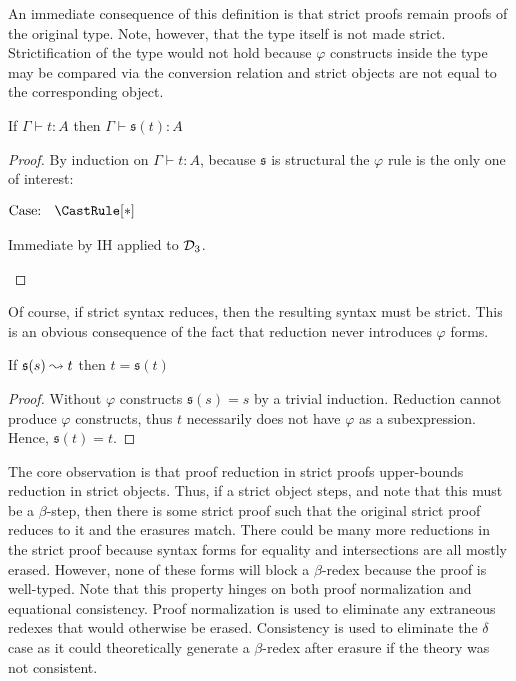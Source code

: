 An immediate consequence of this definition is that strict proofs remain proofs of the original type.
Note, however, that the type itself is not made strict.
Strictification of the type would not hold because $\varphi$ constructs inside the type may be compared via the conversion relation and strict objects are not equal to the corresponding object.
\begin{lemma}
    \label{lem:5:strict_proof}
    If $\Gamma \vdash t : A$ then $\Gamma \vdash \mathfrak{s}(t) : A$
\end{lemma}
\begin{proof}
    By induction on $\Gamma \vdash t : A$, because $\mathfrak{s}$ is structural the $\varphi$ rule is the only one of interest:

    $\text{Case: }\begin{array}{c} \CastRule[*] \end{array}$
    \begin{proofcase}
        Immediate by IH applied to $\mathcal{D}_{3}$.
    \end{proofcase}
\end{proof}
Of course, if strict syntax reduces, then the resulting syntax must be strict.
This is an obvious consequence of the fact that reduction never introduces $\varphi$ forms.
\begin{lemma}
    \label{lem:5:strict_preservation}
    If $\mathfrak{s}(s) \leadsto t$ then $t = \mathfrak{s}(t)$
\end{lemma}
\begin{proof}
    Without $\varphi$ constructs $\mathfrak{s}(s) = s$ by a trivial induction.
    Reduction cannot produce $\varphi$ constructs, thus $t$ necessarily does not have $\varphi$ as a subexpression.
    Hence, $\mathfrak{s}(t) = t$.
\end{proof}
The core observation is that proof reduction in strict proofs upper-bounds reduction in strict objects.
Thus, if a strict object steps, and note that this must be a $\beta$-step, then there is some strict proof such that the original strict proof reduces to it and the erasures match.
There could be many more reductions in the strict proof because syntax forms for equality and intersections are all mostly erased.
However, none of these forms will block a $\beta$-redex because the proof is well-typed.
Note that this property hinges on both proof normalization and equational consistency.
Proof normalization is used to eliminate any extraneous redexes that would otherwise be erased.
Consistency is used to eliminate the $\delta$ case as it could theoretically generate a $\beta$-redex after erasure if the theory was not consistent.

